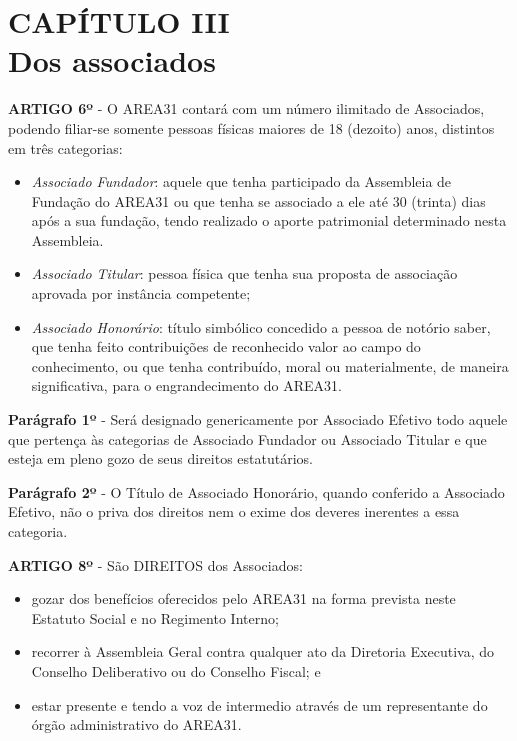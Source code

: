 \chapter*{CAPÍTULO III \\ Dos associados}


\textbf{ARTIGO 6º} - O AREA31 contará com um número ilimitado de Associados, 
podendo filiar-se somente pessoas físicas maiores de 18 (dezoito) anos, 
distintos em três categorias:

\begin{itemize}
    \item \emph{Associado Fundador}: aquele que tenha participado da 
        Assembleia de Fundação do AREA31 ou que tenha se associado a ele 
        até 30 (trinta) dias após a sua fundação, tendo realizado o aporte 
        patrimonial determinado nesta Assembleia.
    \item \emph{Associado Titular}: pessoa física que tenha sua proposta de 
        associação aprovada por instância competente;
    \item \emph{Associado Honorário}: título simbólico concedido a pessoa de 
        notório saber, que tenha feito contribuições de reconhecido valor ao 
        campo do conhecimento, ou que tenha contribuído, moral ou 
        materialmente, de maneira significativa, para o 
        engrandecimento do AREA31.
\end{itemize}

\textbf{Parágrafo 1º} - Será designado genericamente por Associado Efetivo 
todo aquele que pertença às categorias de Associado Fundador ou Associado 
Titular e que esteja em pleno gozo de seus direitos estatutários.

\bigskip

\textbf{Parágrafo 2º} - O Título de Associado Honorário, quando conferido a 
Associado Efetivo, não o priva dos direitos nem o exime dos deveres 
inerentes a essa categoria.

\bigskip

\textbf{ARTIGO 8º} - São DIREITOS dos Associados:

\begin{itemize}
    \item gozar dos benefícios oferecidos pelo AREA31 na forma prevista 
        neste Estatuto Social e no Regimento Interno; 
    \item recorrer à Assembleia Geral contra qualquer ato da Diretoria 
        Executiva, do Conselho Deliberativo ou do Conselho Fiscal; e
    \item estar presente e tendo a voz de intermedio através de um 
        representante do órgão administrativo do AREA31.
\end{itemize}


